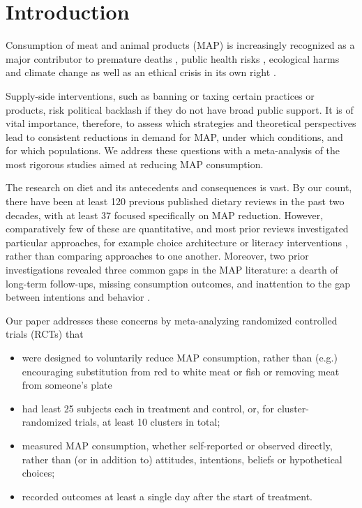 \documentclass[sn-nature,pdflatex]{sn-jnl}
\begin{document}
\maketitle

\section{Introduction}\label{sec1}

Consumption of meat and animal products (MAP) is increasingly recognized
as a major contributor to premature deaths
\citep{willett2019, landry2023}, public health risks
\citep{slingenbergh2004, graham2008}, ecological harms
\citep{greger2010} and climate change
\citep{scarborough2023, koneswaran2008} as well as an ethical crisis in
its own right \citep{kuruc2023, singer2023}.

Supply-side interventions, such as banning or taxing certain practices
or products, risk political backlash if they do not have broad public
support. It is of vital importance, therefore, to assess which
strategies and theoretical perspectives lead to consistent reductions in
demand for MAP, under which conditions, and for which populations. We
address these questions with a meta-analysis of the most rigorous
studies aimed at reducing MAP consumption.

The research on diet and its antecedents and consequences is vast. By
our count, there have been at least 120 previous published dietary
reviews in the past two decades, with at least 37 focused specifically
on MAP reduction. However, comparatively few of these are quantitative,
and most prior reviews investigated particular approaches, for example
choice architecture \citep{bianchi2018restructuring} or literacy
interventions \citep{DiGennaro2024}, rather than comparing approaches to
one another. Moreover, two prior investigations revealed three common
gaps in the MAP literature: a dearth of long-term follow-ups, missing
consumption outcomes, and inattention to the gap between intentions and
behavior \citep{mathur2021meta, mathur2021effectiveness}.

Our paper addresses these concerns by meta-analyzing randomized
controlled trials (RCTs) that

\begin{itemize}
\item
  were designed to voluntarily reduce MAP consumption, rather than
  (e.g.) encouraging substitution from red to white meat or fish or
  removing meat from someone's plate
\item
  had least 25 subjects each in treatment and control, or, for
  cluster-randomized trials, at least 10 clusters in total;
\item
  measured MAP consumption, whether self-reported or observed directly,
  rather than (or in addition to) attitudes, intentions, beliefs or
  hypothetical choices;
\item
  recorded outcomes at least a single day after the start of treatment.
\end{itemize}
\end{document}
